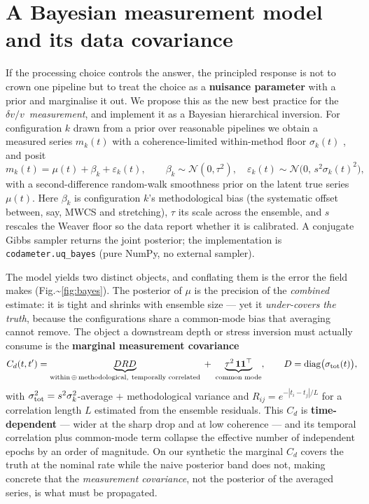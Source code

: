 \documentclass[
  11pt,
  letterpaper,
]{article}
\providecommand{\dvv}{\ensuremath{\delta v/v}}
\begin{document}
\section{A Bayesian measurement model and its data
covariance}\label{sec:bayes}

If the processing choice controls the answer, the principled response is
not to crown one pipeline but to treat the choice as a \textbf{nuisance
parameter} with a prior and marginalise it out. We propose this as the
new best practice for the \dvv~\emph{measurement}, and implement it as a
Bayesian hierarchical inversion. For configuration \(k\) drawn from a
prior over reasonable pipelines we obtain a measured series \(m_k(t)\)
with a coherence-limited within-method floor \(\sigma_k(t)\)
\citep{Weaver2011, Clarke2011}, and posit \begin{equation}
m_k(t) = \mu(t) + \beta_k + \varepsilon_k(t), \qquad
\beta_k\sim\mathcal N(0,\tau^2),\quad
\varepsilon_k(t)\sim\mathcal N\!\big(0,\,s^2\sigma_k(t)^2\big),
\label{eq:bayes}
\end{equation} with a second-difference random-walk smoothness prior on
the latent true series \(\mu(t)\). Here \(\beta_k\) is configuration
\(k\)'s methodological bias (the systematic offset between, say, MWCS
and stretching), \(\tau\) its scale across the ensemble, and \(s\)
rescales the Weaver floor so the data report whether it is calibrated. A
conjugate Gibbs sampler returns the joint posterior; the implementation
is \texttt{codameter.uq\_bayes} (pure NumPy, no external sampler).

The model yields two distinct objects, and conflating them is the error
the field makes (Fig.\textasciitilde{}\ref{fig:bayes}). The posterior of
\(\mu\) is the precision of the \emph{combined} estimate: it is tight
and shrinks with ensemble size --- yet it \emph{under-covers the truth},
because the configurations share a common-mode bias that averaging
cannot remove. The object a downstream depth or stress inversion must
actually consume is the \textbf{marginal measurement covariance}
\begin{equation}
C_d(t,t') = \underbrace{D R D}_{\text{within}\,\oplus\,\text{methodological},\ \text{temporally correlated}}
\;+\; \underbrace{\tau^2\,\mathbf{1}\mathbf{1}^\top}_{\text{common mode}},
\qquad D=\operatorname{diag}\!\big(\sigma_{\rm tot}(t)\big),
\label{eq:cd}
\end{equation} with \(\sigma_{\rm tot}^2 = s^2\sigma_k^2\)-average \(+\)
methodological variance and \(R_{ij}=e^{-|t_i-t_j|/L}\) for a
correlation length \(L\) estimated from the ensemble residuals. This
\(C_d\) is \textbf{time-dependent} --- wider at the sharp drop and at
low coherence --- and its temporal correlation plus common-mode term
collapse the effective number of independent epochs by an order of
magnitude. On our synthetic the marginal \(C_d\) covers the truth at the
nominal rate while the naive posterior band does not, making concrete
that the \emph{measurement covariance}, not the posterior of the
averaged series, is what must be propagated.
\end{document}
